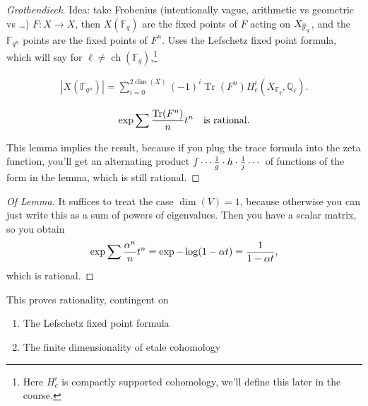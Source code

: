 \begin{proof}[Grothendieck]

Idea: take Frobenius (intentionally vague, arithmetic vs geometric vs
\ldots) \(F:X\to X\), then \(X({\mathbb{F}}_q)\) are the fixed points of
\(F\) acting on
\(X_{\mkern 1.5mu\overline{\mkern-1.5mu{\mathbb{F}}\mkern-1.5mu}\mkern 1.5mu_q}\),
and the \({\mathbb{F}}_{q^n}\) points are the fixed points of \(F^n\).
Uses the Lefschetz fixed point formula, which will say for
\(\ell\neq \operatorname{ch}({\mathbb{F}}_q)\),\footnote{Here \(H^i_c\)
  is compactly supported cohomology, we'll define this later in the
  course.}

\begin{align*}  
{\left\lvert {X({\mathbb{F}}_{q^n})} \right\rvert} = \sum_{i=0}^{2\dim(X)} (-1)^i \operatorname{Tr}(F^n) H^i_c(X_{{\mathbb{F}}_q}, {\mathbb{Q}}_\ell)
.\end{align*}

\begin{lemma}

\begin{align*}  
\exp{\sum {\operatorname{Tr}(F^n) \over n}t^n  }\quad\text{is rational}
.\end{align*}

\end{lemma}

This lemma implies the result, because if you plug the trace formula
into the zeta function, you'll get an alternating product
\(f \cdots {1\over g} \cdot h \cdot {1\over j} \cdots\) of functions of
the form in the lemma, which is still rational.

\end{proof}

\begin{proof}[Of Lemma]

It suffices to treat the case \(\dim(V) = 1\), because otherwise you can
just write this as a sum of powers of eigenvalues. Then you have a
scalar matrix, so you obtain
\begin{align*}  
\exp{ \sum {\alpha^n \over n} t^n} = \exp{ -\log(1 - \alpha t)} = {1 \over 1-\alpha t}
,\end{align*}
which is rational.

\end{proof}

This proves rationality, contingent on

\begin{enumerate}
\def\labelenumi{\arabic{enumi}.}
\tightlist
\item
  The Lefschetz fixed point formula
\item
  The finite dimensionality of etale cohomology
\end{enumerate}


